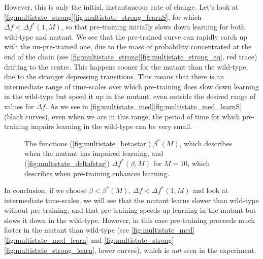 \documentclass[12pt]{article}
\begin{document}
However, this is only the initial, instantaneous rate of change.
Let's look at \autoref{fig:multistate_strong}\ref{fig:multistate_strong_learnS}, for which $\Delta f < \Delta f^*(1,M)$, so that pre-training initially slows down learning for both wild-type and mutant.
We see that the pre-trained curve can rapidly catch up with the un-pre-trained one, due to the mass of probability concentrated at the end of the chain (see \autoref{fig:multistate_strong}\ref{fig:multistate_strong_eq}, red trace) drifting to the centre.
This happens sooner for the mutant than the wild-type, due to the stronger depressing transitions.
This means that there is an intermediate range of time-scales over which pre-training does slow down learning in the wild-type but speed it up in the mutant, even outside the desired range of values for $\Delta f$.
As we see in \autoref{fig:multistate_med}\ref{fig:multistate_med_learnS} (black curves), even when we are in this range, the period of time for which pre-training impairs learning in the wild-type can be very small.

\begin{figure}
 \begin{center}
 \begin{myenuma}
  \item{}\label{fig:multistate_betastar}
  \item{}\label{fig:multistate_deltafstar}
 \end{myenuma}
 \end{center}
  \caption[The functions $\beta^*(M)$ and $\Delta f^*(\beta,M)$]{The functions (\ref{fig:multistate_betastar}) $\beta^*(M)$, which describes when the mutant has impaired learning, and (\ref{fig:multistate_deltafstar}) $\Delta f^*(\beta,M)$ for $M=10$, which describes when pre-training enhances learning.}\label{fig:multistate_star}
\end{figure}

In conclusion, if we choose $\beta<\beta^*(M)$, $\Delta f < \Delta f^*(1,M)$ and look at intermediate time-scales, we will see that the mutant learns slower than wild-type without pre-training, and that pre-training speeds up learning in the mutant but slows it down in the wild-type.
However, in this case pre-training proceeds much faster in the mutant than wild-type (see \autoref{fig:multistate_med}\ref{fig:multistate_med_learn} and \autoref{fig:multistate_strong}\ref{fig:multistate_strong_learn}, lower curves), which is \emph{not} seen in the experiment.
\end{document}
